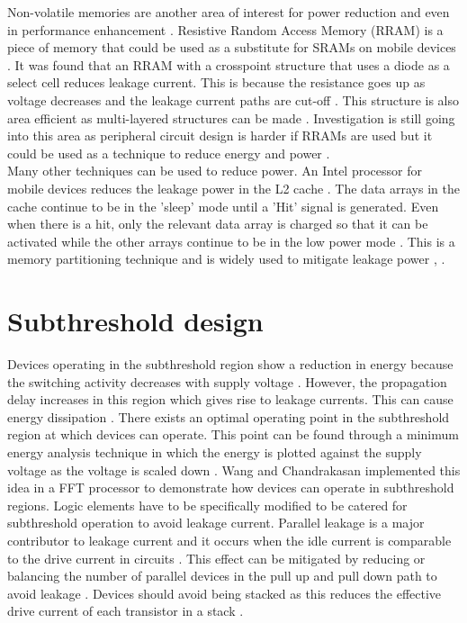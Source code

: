 \documentclass[journal]{IEEEtran}
\begin{document}
Non-volatile memories are another area of interest for power reduction and even in performance enhancement \cite{NonVolatile}. Resistive Random Access Memory (RRAM) is a piece of memory that could be used as a substitute for SRAMs on mobile devices \cite{NonVolatile}. It was found that an RRAM with a crosspoint structure that uses a diode as a select cell reduces leakage current. This is because the resistance goes up as voltage decreases and the leakage current paths are cut-off \cite{NonVolatile}. This structure is also area efficient as multi-layered structures can be made \cite{NonVolatile}. Investigation is still going into this area as peripheral circuit design is harder if RRAMs are used but it could be used as a technique to reduce energy and power \cite{NonVolatile}.\\

Many other techniques can be used to reduce power. An Intel processor for mobile devices reduces the leakage power in the L2 cache \cite{Intel}. The data arrays in the cache continue to be in the 'sleep' mode until a 'Hit' signal is generated. Even when there is a hit, only the relevant data array is charged so that it can be activated while the other arrays continue to be in the low power mode \cite{Intel}. This is a memory partitioning technique and is widely used to mitigate leakage power \cite{LowPower2005}, \cite{Intel}.

\section{Subthreshold design}
Devices operating in the subthreshold region show a reduction in energy because the switching activity decreases with supply voltage \cite{FFT}. However, the propagation delay increases in this region which gives rise to leakage currents. This can cause energy dissipation \cite{FFT}. There exists an optimal operating point in the subthreshold region at which devices can operate. This point can be found through a minimum energy analysis technique in which the energy is plotted against the supply voltage as the voltage is scaled down \cite{FFT}. Wang and Chandrakasan \cite{FFT} implemented this idea in a FFT processor to demonstrate how devices can operate in subthreshold regions. Logic elements have to be specifically modified to be catered for subthreshold operation to avoid leakage current. Parallel leakage is a major contributor to leakage current and it occurs when the idle current is comparable to the drive current in circuits \cite{FFT}. This effect can be mitigated by reducing or balancing the number of parallel devices in the pull up and pull down path to avoid leakage \cite{FFT}. Devices should avoid being stacked as this reduces the effective drive current of each transistor in a stack \cite{FFT}. \\
\end{document}

